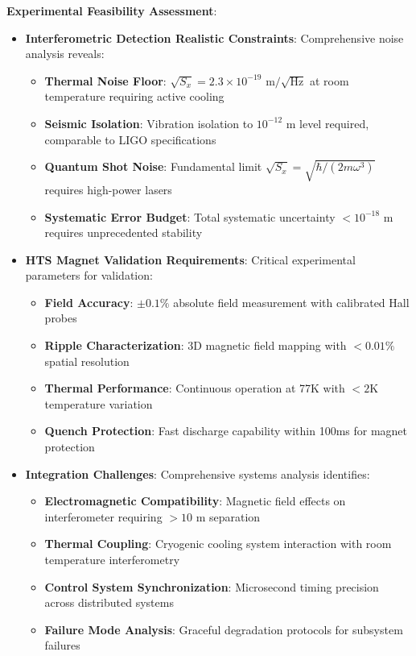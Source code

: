 \documentclass[10pt,twocolumn]{article}
\begin{document}
\textbf{Experimental Feasibility Assessment}:

\begin{itemize}
\item \textbf{Interferometric Detection Realistic Constraints}: Comprehensive noise analysis reveals:
   \begin{itemize}
   \item \textbf{Thermal Noise Floor}: $\sqrt{S_x} = 2.3 \times 10^{-19}$ m$/\sqrt{\text{Hz}}$ at room temperature requiring active cooling
   \item \textbf{Seismic Isolation}: Vibration isolation to $10^{-12}$ m level required, comparable to LIGO specifications
   \item \textbf{Quantum Shot Noise}: Fundamental limit $\sqrt{S_x} = \sqrt{\hbar/(2m\omega^3)}$ requires high-power lasers
   \item \textbf{Systematic Error Budget}: Total systematic uncertainty $< 10^{-18}$ m requires unprecedented stability
   \end{itemize}

\item \textbf{HTS Magnet Validation Requirements}: Critical experimental parameters for validation:
   \begin{itemize}
   \item \textbf{Field Accuracy}: $\pm 0.1\%$ absolute field measurement with calibrated Hall probes
   \item \textbf{Ripple Characterization}: 3D magnetic field mapping with $< 0.01\%$ spatial resolution
   \item \textbf{Thermal Performance}: Continuous operation at 77K with $< 2$K temperature variation
   \item \textbf{Quench Protection}: Fast discharge capability within 100ms for magnet protection
   \end{itemize}

\item \textbf{Integration Challenges}: Comprehensive systems analysis identifies:
   \begin{itemize}
   \item \textbf{Electromagnetic Compatibility}: Magnetic field effects on interferometer requiring $> 10$ m separation
   \item \textbf{Thermal Coupling}: Cryogenic cooling system interaction with room temperature interferometry
   \item \textbf{Control System Synchronization}: Microsecond timing precision across distributed systems
   \item \textbf{Failure Mode Analysis}: Graceful degradation protocols for subsystem failures
   \end{itemize}
\end{itemize}
\end{document}
